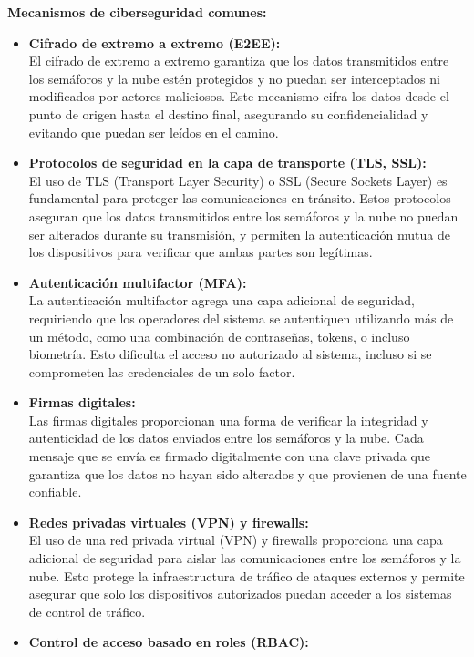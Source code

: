 \documentclass[12pt,a4paper,oneside]{report}
\begin{document}
\textbf{Mecanismos de ciberseguridad comunes:}

\begin{itemize}
\item
  \textbf{Cifrado de extremo a extremo (E2EE):\\
  }El cifrado de extremo a extremo garantiza que los datos transmitidos entre los semáforos y la nube estén protegidos y no puedan ser interceptados ni modificados por actores maliciosos. Este mecanismo cifra los datos desde el punto de origen hasta el destino final, asegurando su confidencialidad y evitando que puedan ser leídos en el camino.
\item
  \textbf{Protocolos de seguridad en la capa de transporte (TLS, SSL):\\
  }El uso de TLS (Transport Layer Security) o SSL (Secure Sockets Layer) es fundamental para proteger las comunicaciones en tránsito. Estos protocolos aseguran que los datos transmitidos entre los semáforos y la nube no puedan ser alterados durante su transmisión, y permiten la autenticación mutua de los dispositivos para verificar que ambas partes son legítimas.
\item
  \textbf{Autenticación multifactor (MFA):\\
  }La autenticación multifactor agrega una capa adicional de seguridad, requiriendo que los operadores del sistema se autentiquen utilizando más de un método, como una combinación de contraseñas, tokens, o incluso biometría. Esto dificulta el acceso no autorizado al sistema, incluso si se comprometen las credenciales de un solo factor.
\item
  \textbf{Firmas digitales:\\
  }Las firmas digitales proporcionan una forma de verificar la integridad y autenticidad de los datos enviados entre los semáforos y la nube. Cada mensaje que se envía es firmado digitalmente con una clave privada que garantiza que los datos no hayan sido alterados y que provienen de una fuente confiable.
\item
  \textbf{Redes privadas virtuales (VPN) y firewalls:\\
  }El uso de una red privada virtual (VPN) y firewalls proporciona una capa adicional de seguridad para aislar las comunicaciones entre los semáforos y la nube. Esto protege la infraestructura de tráfico de ataques externos y permite asegurar que solo los dispositivos autorizados puedan acceder a los sistemas de control de tráfico.
\item
  \textbf{Control de acceso basado en roles (RBAC):\\
}
\end{itemize}
\end{document}
